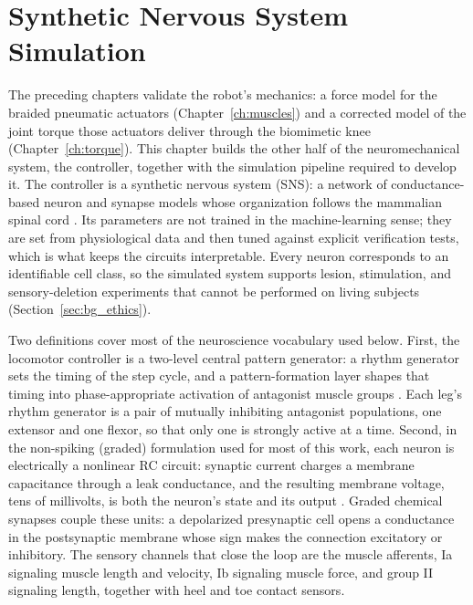\chapter{Synthetic Nervous System Simulation}\label{ch:sns}
\graphicspath{{D:/Github/Bipedal_Robot/Documentation/Reports and Papers/Dissertation/Figures/60-sns/}{figs/60-sns/}{D:/Github/Bipedal_Robot/Documentation/Reports and Papers/Dissertation/Figures/60-sns/AnimatLab_reference/}{figs/60-sns/AnimatLab_reference/}}

The preceding chapters validate the robot's mechanics: a force model for the braided pneumatic actuators (Chapter~\ref{ch:muscles}) and a corrected model of the joint torque those actuators deliver through the biomimetic knee (Chapter~\ref{ch:torque}). This chapter builds the other half of the neuromechanical system, the controller, together with the simulation pipeline required to develop it. The controller is a synthetic nervous system (SNS): a network of conductance-based neuron and synapse models whose organization follows the mammalian spinal cord \citep{rybak_modelling_2006, mccrea_organization_2008, deng_neuromechanical_2019}. Its parameters are not trained in the machine-learning sense; they are set from physiological data and then tuned against explicit verification tests, which is what keeps the circuits interpretable. Every neuron corresponds to an identifiable cell class, so the simulated system supports lesion, stimulation, and sensory-deletion experiments that cannot be performed on living subjects (Section~\ref{sec:bg_ethics}).

Two definitions cover most of the neuroscience vocabulary used below. First, the locomotor controller is a two-level central pattern generator: a rhythm generator sets the timing of the step cycle, and a pattern-formation layer shapes that timing into phase-appropriate activation of antagonist muscle groups \citep{rybak_modelling_2006}. Each leg's rhythm generator is a pair of mutually inhibiting antagonist populations, one extensor and one flexor, so that only one is strongly active at a time. Second, in the non-spiking (graded) formulation used for most of this work, each neuron is electrically a nonlinear RC circuit: synaptic current charges a membrane capacitance through a leak conductance, and the resulting membrane voltage, tens of millivolts, is both the neuron's state and its output \citep{nourse_sns_2023}. Graded chemical synapses couple these units: a depolarized presynaptic cell opens a conductance in the postsynaptic membrane whose sign makes the connection excitatory or inhibitory. The sensory channels that close the loop are the muscle afferents, Ia signaling muscle length and velocity, Ib signaling muscle force, and group II signaling length, together with heel and toe contact sensors.

